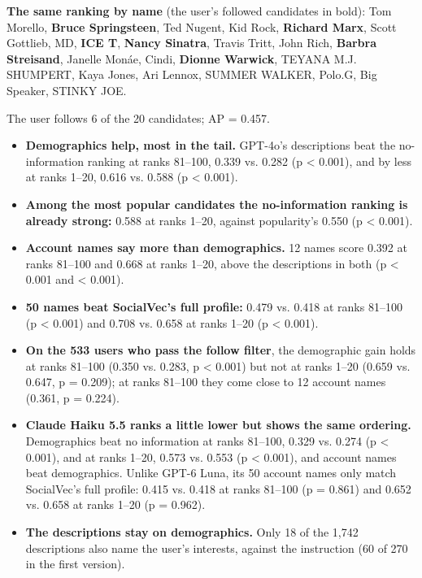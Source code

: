 \documentclass[10pt]{article}
\begin{document}
\textbf{The same ranking by name} (the user's followed candidates in bold): Tom Morello, \textbf{Bruce Springsteen}, Ted Nugent, Kid Rock, \textbf{Richard Marx}, Scott Gottlieb, MD, \textbf{ICE T}, \textbf{Nancy Sinatra}, Travis Tritt, John Rich, \textbf{Barbra Streisand}, Janelle Monáe, Cindi, \textbf{Dionne Warwick}, TEYANA M.J. SHUMPERT, Kaya Jones, Ari Lennox, SUMMER WALKER, Polo.G, Big Speaker, STINKY JOE.

The user follows 6 of the 20 candidates; AP = 0.457.

\begin{itemize}
  \item \textbf{Demographics help, most in the tail.} GPT-4o's descriptions beat the no-information ranking at ranks 81--100, 0.339 vs. 0.282 (p \textless{} 0.001), and by less at ranks 1--20, 0.616 vs. 0.588 (p \textless{} 0.001).
  \item \textbf{Among the most popular candidates the no-information ranking is already strong:} 0.588 at ranks 1--20, against popularity's 0.550 (p \textless{} 0.001).
  \item \textbf{Account names say more than demographics.} 12 names score 0.392 at ranks 81--100 and 0.668 at ranks 1--20, above the descriptions in both (p \textless{} 0.001 and \textless{} 0.001).
  \item \textbf{50 names beat SocialVec's full profile:} 0.479 vs. 0.418 at ranks 81--100 (p \textless{} 0.001) and 0.708 vs. 0.658 at ranks 1--20 (p \textless{} 0.001).
  \item \textbf{On the 533 users who pass the follow filter}, the demographic gain holds at ranks 81--100 (0.350 vs. 0.283, p \textless{} 0.001) but not at ranks 1--20 (0.659 vs. 0.647, p = 0.209); at ranks 81--100 they come close to 12 account names (0.361, p = 0.224).
  \item \textbf{Claude Haiku 5.5 ranks a little lower but shows the same ordering.} Demographics beat no information at ranks 81--100, 0.329 vs. 0.274 (p \textless{} 0.001), and at ranks 1--20, 0.573 vs. 0.553 (p \textless{} 0.001), and account names beat demographics. Unlike GPT-6 Luna, its 50 account names only match SocialVec's full profile: 0.415 vs. 0.418 at ranks 81--100 (p = 0.861) and 0.652 vs. 0.658 at ranks 1--20 (p = 0.962).
  \item \textbf{The descriptions stay on demographics.} Only 18 of the 1,742 descriptions also name the user's interests, against the instruction (60 of 270 in the first version).
\end{itemize}
\end{document}

